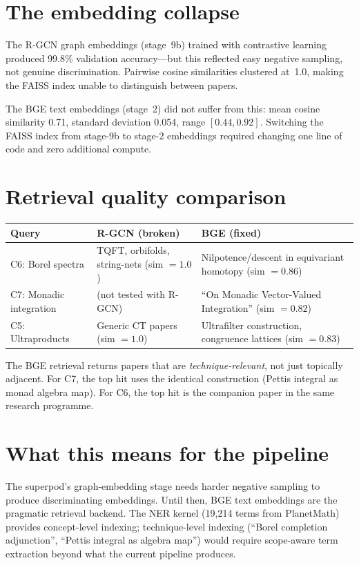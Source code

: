 \documentclass[12pt,oneside]{book}
\theoremstyle{plain}
\theoremstyle{definition}
\theoremstyle{remark}
\begin{document}
\section{The embedding collapse}

The R-GCN graph embeddings (stage~9b) trained with contrastive
learning produced 99.8\% validation accuracy---but this reflected
easy negative sampling, not genuine discrimination. Pairwise cosine
similarities clustered at~1.0, making the FAISS index unable to
distinguish between papers.

The BGE text embeddings (stage~2) did not suffer from this: mean
cosine similarity 0.71, standard deviation 0.054, range
$[0.44, 0.92]$. Switching the FAISS index from stage-9b to stage-2
embeddings required changing one line of code and zero additional
compute.

\section{Retrieval quality comparison}

\begin{center}
\begin{tabular}{lp{4cm}p{4cm}}
\toprule
\textbf{Query} & \textbf{R-GCN (broken)} & \textbf{BGE (fixed)} \\
\midrule
C6: Borel spectra
  & TQFT, orbifolds, string-nets (sim $= 1.0$)
  & Nilpotence/descent in equivariant homotopy (sim $= 0.86$) \\[4pt]
C7: Monadic integration
  & (not tested with R-GCN)
  & ``On Monadic Vector-Valued Integration'' (sim $= 0.82$) \\[4pt]
C5: Ultraproducts
  & Generic CT papers (sim $= 1.0$)
  & Ultrafilter construction, congruence lattices (sim $= 0.83$) \\
\bottomrule
\end{tabular}
\end{center}

The BGE retrieval returns papers that are \emph{technique-relevant},
not just topically adjacent. For C7, the top hit uses the identical
construction (Pettis integral as monad algebra map). For C6, the top
hit is the companion paper in the same research programme.

\section{What this means for the pipeline}

The superpod's graph-embedding stage needs harder negative sampling to
produce discriminating embeddings. Until then, BGE text embeddings are
the pragmatic retrieval backend. The NER kernel (19{,}214 terms from
PlanetMath) provides concept-level indexing; technique-level indexing
(``Borel completion adjunction'', ``Pettis integral as algebra map'')
would require scope-aware term extraction beyond what the current
pipeline produces.
\end{document}
